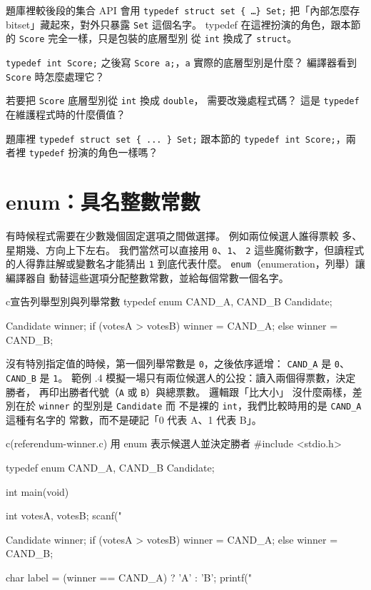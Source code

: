 題庫裡較後段的集合 API 會用 \texttt{typedef struct set \{ \ldots \} Set;}
把「內部怎麼存 bitset」藏起來，對外只暴露 \texttt{Set} 這個名字。  typedef
在這裡扮演的角色，跟本節的 \texttt{Score} 完全一樣，只是包裝的底層型別
從 \texttt{int} 換成了 \texttt{struct}。

\begin{drills}[label=drills:ext-typedef]
\item \texttt{typedef int Score;} 之後寫 \texttt{Score a;}，\texttt{a}
實際的底層型別是什麼？ 編譯器看到 \texttt{Score} 時怎麼處理它？
\item 若要把 \texttt{Score} 底層型別從 \texttt{int} 換成 \texttt{double}，
需要改幾處程式碼？ 這是 \texttt{typedef} 在維護程式時的什麼價值？
\item 題庫裡 \texttt{typedef struct set \{ ... \} Set;} 跟本節的
\texttt{typedef int Score;}，兩者裡 \texttt{typedef} 扮演的角色一樣嗎？
\end{drills}

\section{enum：具名整數常數}
\label{sec:ext-enum}

有時候程式需要在少數幾個固定選項之間做選擇。 例如兩位候選人誰得票較
多、星期幾、方向上下左右。 我們當然可以直接用 \texttt{0}、\texttt{1}、
\texttt{2} 這些魔術數字，但讀程式的人得靠註解或變數名才能猜出
\texttt{1} 到底代表什麼。 \texttt{enum}（enumeration，列舉）讓編譯器自
動替這些選項分配整數常數，並給每個常數一個名字。

\begin{code}{c}{宣告列舉型別與列舉常數}
typedef enum { CAND_A, CAND_B } Candidate;

Candidate winner;
if (votesA > votesB) {
    winner = CAND_A;
} else {
    winner = CAND_B;
}
\end{code}

沒有特別指定值的時候，第一個列舉常數是 \texttt{0}，之後依序遞增：
\texttt{CAND\_A} 是 \texttt{0}、\texttt{CAND\_B} 是 \texttt{1}。 範例
\thechapter.4 模擬一場只有兩位候選人的公投：讀入兩個得票數，決定勝者，
再印出勝者代號（\texttt{A} 或 \texttt{B}）與總票數。 邏輯跟「比大小」
沒什麼兩樣，差別在於 \texttt{winner} 的型別是 \texttt{Candidate} 而
不是裸的 \texttt{int}，我們比較時用的是 \texttt{CAND\_A} 這種有名字的
常數，而不是硬記「0 代表 A、1 代表 B」。

\begin{example}{c}{(referendum-winner.c) 用 enum 表示候選人並決定勝者}
#include <stdio.h>

typedef enum { CAND_A, CAND_B } Candidate;

int main(void) {
    int votesA, votesB;
    scanf("%

    Candidate winner;
    if (votesA > votesB) {
        winner = CAND_A;
    } else {
        winner = CAND_B;
    }

    char label = (winner == CAND_A) ? 'A' : 'B';
    printf("%
}
\end{example}

